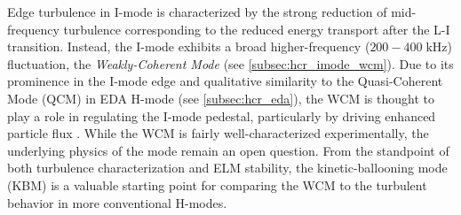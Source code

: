 \begin{figure}[t]
 \pushtooutside
\end{figure}

Edge turbulence in I-mode is characterized by the strong reduction of mid-frequency turbulence corresponding to the reduced energy transport after the L-I transition.  Instead, the I-mode exhibits a broad higher-frequency ($200-400\;\si{\kilo\hertz}$) fluctuation, the \emph{Weakly-Coherent Mode} \cite{Whyte2010,Hubbard2011,Cziegler2013} (see \cref{subsec:hcr_imode_wcm}).  Due to its prominence in the I-mode edge and qualitative similarity to the Quasi-Coherent Mode (QCM) in EDA H-mode \cite{Hubbard2001} (see \cref{subsec:hcr_eda}), the WCM is thought to play a role in regulating the I-mode pedestal, particularly by driving enhanced particle flux \cite{Dominguez2012}.  While the WCM is fairly well-characterized experimentally, the underlying physics of the mode remain an open question.  From the standpoint of both turbulence characterization and ELM stability, the kinetic-ballooning mode (KBM) is a valuable starting point for comparing the WCM to the turbulent behavior in more conventional H-modes.

